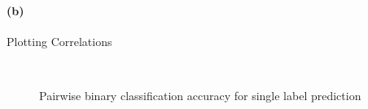 \documentclass{article} %
\begin{document}
\paragraph{(b)} Plotting Correlations
\begin{figure}[ht]
\vspace{-0.5cm}
\centering
{} \\
\caption{Pairwise binary classification accuracy for single label prediction}
\label{fig:singlelab1}
\end{figure}
\end{document}
